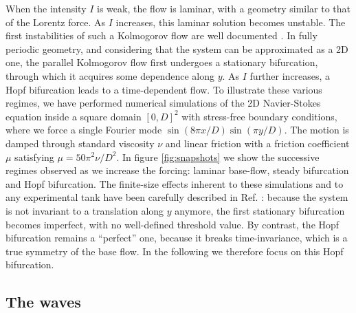 \documentclass[doublecol]{epl2} %
\begin{document}
When the intensity $I$ is weak, the flow is laminar, with a geometry similar to that of the Lorentz force. As $I$ increases, this laminar solution becomes unstable. The first instabilities of such a Kolmogorov flow are well documented  \cite{Bodarenko1979,Thess1992,Juttner1997,Michel,Tithof2017}. In fully periodic geometry, and considering that the system can be approximated as a 2D one, the parallel Kolmogorov flow first undergoes a stationary bifurcation, through which it acquires  some dependence along $y$. As $I$ further increases, a Hopf bifurcation leads to a time-dependent flow. To illustrate these various regimes, we have performed numerical simulations of the 2D Navier-Stokes equation inside a square domain $[0,D]^2$ with stress-free boundary conditions, where we force a single Fourier mode $\sin(8\pi x/D)\sin(\pi y/D)$. The motion is damped through standard viscosity $\nu$ and linear friction with a friction coefficient $\mu$ satisfying $\mu=50 \pi^2 \nu/D^2$. In figure \ref{fig:snapshots} we show the successive regimes observed as we increase the forcing: laminar base-flow, steady bifurcation and Hopf bifurcation. The finite-size effects inherent to these simulations and to any experimental tank have been carefully described in Ref. \cite{Tithof2017}: because the system is not invariant to a translation along $y$ anymore, the first stationary bifurcation becomes imperfect, with no well-defined threshold value. By contrast, the Hopf bifurcation remains a ``perfect'' one, because it breaks time-invariance, which is a true symmetry of the base flow. In the following we therefore focus on this Hopf bifurcation.


\begin{figure*}[t]
          \caption{Streamfunction from numerical solutions of the 2D Navier-Stokes equation. Light color is positive and dark color is negative. Increasing the forcing from left to right: laminar solution, steady bifurcation, and oscillatory state shown at two instants separated by half a period. The dashed-line on the two last panels symbolizes the wave
path over which the velocity is integrated (from left to right) in the present velocimetry method. This integrated velocity oscillates in time: its minimum and maximum values correspond respectively to the flows displayed in the third and fourth snapshots.  \label{fig:snapshots}}
\end{figure*}


\subsection{The waves}
\end{document}

